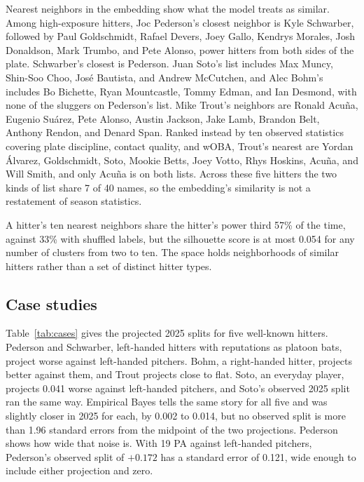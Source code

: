 Nearest neighbors in the embedding show what the model treats as similar. Among high-exposure hitters, Joc Pederson's closest neighbor is Kyle Schwarber, followed by Paul Goldschmidt, Rafael Devers, Joey Gallo, Kendrys Morales, Josh Donaldson, Mark Trumbo, and Pete Alonso, power hitters from both sides of the plate. Schwarber's closest is Pederson. Juan Soto's list includes Max Muncy, Shin-Soo Choo, José Bautista, and Andrew McCutchen, and Alec Bohm's includes Bo Bichette, Ryan Mountcastle, Tommy Edman, and Ian Desmond, with none of the sluggers on Pederson's list. Mike Trout's neighbors are Ronald Acuña, Eugenio Suárez, Pete Alonso, Austin Jackson, Jake Lamb, Brandon Belt, Anthony Rendon, and Denard Span. Ranked instead by ten observed statistics covering plate discipline, contact quality, and wOBA, Trout's nearest are Yordan Álvarez, Goldschmidt, Soto, Mookie Betts, Joey Votto, Rhys Hoskins, Acuña, and Will Smith, and only Acuña is on both lists. Across these five hitters the two kinds of list share 7 of 40 names, so the embedding's similarity is not a restatement of season statistics.

A hitter's ten nearest neighbors share the hitter's power third 57\% of the time, against 33\% with shuffled labels, but the silhouette score is at most 0.054 for any number of clusters from two to ten. The space holds neighborhoods of similar hitters rather than a set of distinct hitter types.

\subsection{Case studies}
\label{sec:anchors}\label{sec:disagree}

Table~\ref{tab:cases} gives the projected 2025 splits for five well-known hitters. Pederson and Schwarber, left-handed hitters with reputations as platoon bats, project worse against left-handed pitchers. Bohm, a right-handed hitter, projects better against them, and Trout projects close to flat. Soto, an everyday player, projects 0.041 worse against left-handed pitchers, and Soto's observed 2025 split ran the same way. Empirical Bayes tells the same story for all five and was slightly closer in 2025 for each, by 0.002 to 0.014, but no observed split is more than 1.96 standard errors from the midpoint of the two projections. Pederson shows how wide that noise is. With 19 PA against left-handed pitchers, Pederson's observed split of $+0.172$ has a standard error of 0.121, wide enough to include either projection and zero.

